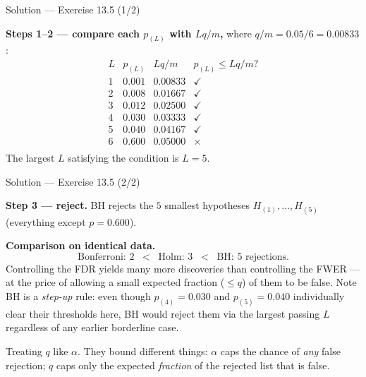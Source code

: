 \documentclass[aspectratio=169,11pt]{beamer}
\begin{document}
\begin{frame}{Solution --- Exercise 13.5 (1/2)}
\begin{solutionbox}
  \textbf{Steps 1--2 --- compare each $p_{(L)}$ with $L q / m$,}
  where $q/m = 0.05/6 = 0.00833$:
  \[
    \begin{array}{c|c|c|c}
      L & p_{(L)} & Lq/m & p_{(L)} \le Lq/m ? \\ \hline
      1 & 0.001 & 0.00833 & \checkmark \\
      2 & 0.008 & 0.01667 & \checkmark \\
      3 & 0.012 & 0.02500 & \checkmark \\
      4 & 0.030 & 0.03333 & \checkmark \\
      5 & 0.040 & 0.04167 & \checkmark \\
      6 & 0.600 & 0.05000 & \times \\
    \end{array}
  \]
  The largest $L$ satisfying the condition is $L = 5$.
\end{solutionbox}
\end{frame}

\begin{frame}{Solution --- Exercise 13.5 (2/2)}
\begin{solutionbox}
  \textbf{Step 3 --- reject.} BH rejects the $5$ smallest hypotheses
  $H_{(1)}, \ldots, H_{(5)}$ (everything except $p = 0.600$).

  \medskip
  \textbf{Comparison on identical data.}
  \[
    \text{Bonferroni: 2} \;\;<\;\; \text{Holm: 3}
    \;\;<\;\; \text{BH: 5 rejections.}
  \]
  Controlling the FDR yields many more discoveries than controlling
  the FWER --- at the price of allowing a small expected fraction
  ($\le q$) of them to be false. Note BH is a \emph{step-up} rule: even
  though $p_{(4)} = 0.030$ and $p_{(5)} = 0.040$ individually clear
  their thresholds here, BH would reject them via the largest passing
  $L$ regardless of any earlier borderline case.

\end{solutionbox}
\begin{mistake}
  Treating $q$ like $\alpha$. They bound different things: $\alpha$ caps the
  chance of \emph{any} false rejection; $q$ caps only the expected
  \emph{fraction} of the rejected list that is false.
\end{mistake}
\end{frame}
\end{document}
